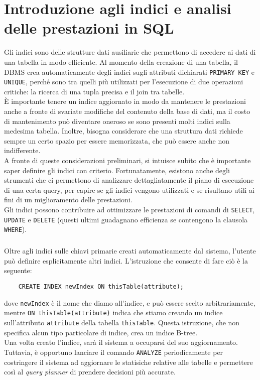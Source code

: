 \documentclass[12pt,a4paper]{book}
\begin{document}
	\chapter{Introduzione agli indici e analisi delle prestazioni in SQL}
	Gli indici sono delle strutture dati ausiliarie che permettono di accedere ai dati di una tabella in modo efficiente. Al momento della creazione di una tabella, il DBMS crea automaticamente degli indici sugli attributi dichiarati \texttt{PRIMARY KEY} e \texttt{UNIQUE}, perché sono tra quelli più utilizzati per l'esecuzione di due operazioni critiche: la ricerca di una tupla precisa e il join tra tabelle.\\ È importante tenere un indice aggiornato in modo da mantenere le prestazioni anche a fronte di svariate modifiche del contenuto della base di dati, ma il costo di mantenimento può diventare oneroso se sono presenti molti indici sulla medesima tabella. Inoltre, bisogna considerare che una struttura dati richiede sempre un certo spazio per essere memorizzata, che può essere anche non indifferente.\\A fronte di queste considerazioni preliminari, si intuisce subito che è importante saper definire gli indici con criterio. Fortunatamente, esistono anche degli strumenti che ci permettono di analizzare dettagliatamente il piano di esecuzione di una certa query, per capire se gli indici vengono utilizzati e se risultano utili ai fini di un miglioramento delle prestazioni.\\Gli indici possono contribuire ad ottimizzare le prestazioni di comandi di \texttt{SELECT}, \texttt{UPDATE} e \texttt{DELETE} (questi ultimi guadagnano efficienza se contengono la clausola \texttt{WHERE}).
	\paragraph{} Oltre agli indici sulle chiavi primarie creati automaticamente dal sistema, l'utente può definire esplicitamente altri indici. L'istruzione che consente di fare ciò è la seguente:
	\begin{lstlisting}
	CREATE INDEX newIndex ON thisTable(attribute);
	\end{lstlisting}
	dove \texttt{newIndex} è il nome che diamo all'indice, e può essere scelto arbitrariamente, mentre \texttt{ON thisTable(attribute)} indica che stiamo creando un indice sull'attributo \texttt{attribute} della tabella \texttt{thisTable}. Questa istruzione, che non specifica alcun tipo particolare di indice, crea un indice B-tree. \\
	Una volta creato l'indice, sarà il sistema a occuparsi del suo aggiornamento. Tuttavia, è opportuno lanciare il comando \texttt{ANALYZE} periodicamente per costringere il sistema ad aggiornare le statisiche relative alle tabelle e permettere così al \textit{query planner} di prendere decisioni più accurate.
\end{document}
